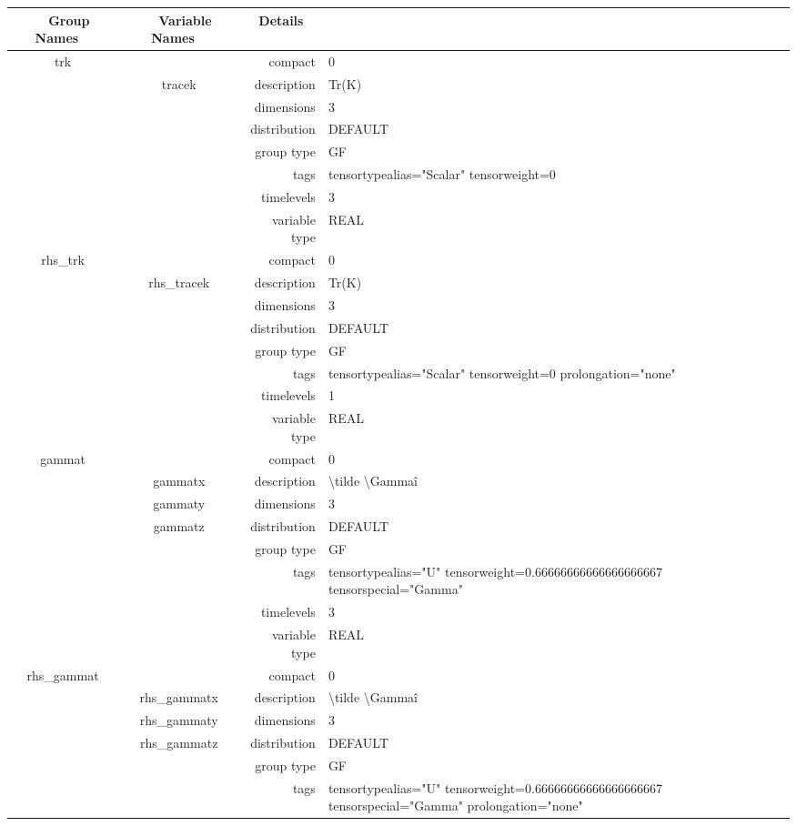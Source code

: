 \begin{tabular*}{150mm}{|c|c@{\extracolsep{\fill}}|rl|} \hline 
~ {\bf Group Names} ~ & ~ {\bf Variable Names} ~  &{\bf Details} ~ & ~ \\ 
\hline 
trk &  & compact & 0 \\ 
 & tracek & description & Tr(K) \\ 
 &  & dimensions & 3 \\ 
 &  & distribution & DEFAULT \\ 
 &  & group type & GF \\ 
 &  & tags & tensortypealias="Scalar" tensorweight=0 \\ 
 &  & timelevels & 3 \\ 
 &  & variable type & REAL \\ 
\hline 
rhs\_trk &  & compact & 0 \\ 
 & rhs\_tracek & description & Tr(K) \\ 
 &  & dimensions & 3 \\ 
 &  & distribution & DEFAULT \\ 
 &  & group type & GF \\ 
 &  & tags & tensortypealias="Scalar" tensorweight=0 prolongation="none" \\ 
 &  & timelevels & 1 \\ 
 &  & variable type & REAL \\ 
\hline 
gammat &  & compact & 0 \\ 
 & gammatx & description & {\textbackslash}tilde {\textbackslash}Gamma\^i \\ 
 & gammaty & dimensions & 3 \\ 
 & gammatz & distribution & DEFAULT \\ 
 &  & group type & GF \\ 
 &  & tags & tensortypealias="U" tensorweight=0.66666666666666666667 tensorspecial="Gamma" \\ 
 &  & timelevels & 3 \\ 
 &  & variable type & REAL \\ 
\hline 
rhs\_gammat &  & compact & 0 \\ 
 & rhs\_gammatx & description & {\textbackslash}tilde {\textbackslash}Gamma\^i \\ 
 & rhs\_gammaty & dimensions & 3 \\ 
 & rhs\_gammatz & distribution & DEFAULT \\ 
 &  & group type & GF \\ 
 &  & tags & tensortypealias="U" tensorweight=0.66666666666666666667 tensorspecial="Gamma" prolongation="none" \\ 

\end{tabular*}
